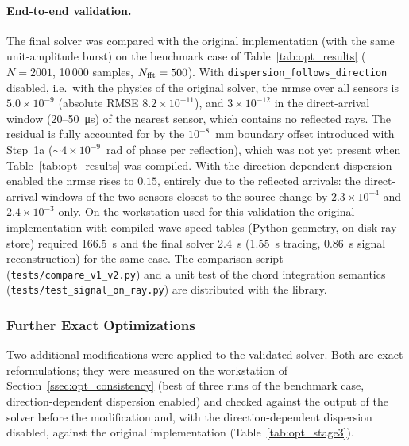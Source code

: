             \paragraph*{End-to-end validation.}
            The final solver was compared with the original implementation (with the same unit-amplitude burst) on the benchmark case of Table~\ref{tab:opt_results} ($N = 2001$, 10\,000 samples, $N_{\rm fft} = 500$). With \texttt{dispersion\_follows\_direction} disabled, i.e.\ with the physics of the original solver, the \acrshort{nrmse} over all sensors is $5.0\times10^{-9}$ (absolute RMSE $8.2\times10^{-11}$), and $3\times10^{-12}$ in the direct-arrival window (20--\SI{50}{\micro\second}) of the nearest sensor, which contains no reflected rays. The residual is fully accounted for by the $10^{-8}$~mm boundary offset introduced with Step~1a ($\sim 4\times10^{-9}$~rad of phase per reflection), which was not yet present when Table~\ref{tab:opt_results} was compiled. With the direction-dependent dispersion enabled the \acrshort{nrmse} rises to $0.15$, entirely due to the reflected arrivals: the direct-arrival windows of the two sensors closest to the source change by $2.3\times10^{-4}$ and $2.4\times10^{-3}$ only. On the workstation used for this validation the original implementation with compiled wave-speed tables (Python geometry, on-disk ray store) required \SI{166.5}{\second} and the final solver \SI{2.4}{\second} (\SI{1.55}{\second} tracing, \SI{0.86}{\second} signal reconstruction) for the same case. The comparison script (\texttt{tests/compare\_v1\_v2.py}) and a unit test of the chord integration semantics (\texttt{tests/test\_signal\_on\_ray.py}) are distributed with the library.


        \subsubsection{Further Exact Optimizations}
        \label{ssec:opt_stage3}

            Two additional modifications were applied to the validated solver. Both are exact reformulations; they were measured on the workstation of Section~\ref{ssec:opt_consistency} (best of three runs of the benchmark case, direction-dependent dispersion enabled) and checked against the output of the solver before the modification and, with the direction-dependent dispersion disabled, against the original implementation (Table~\ref{tab:opt_stage3}).

